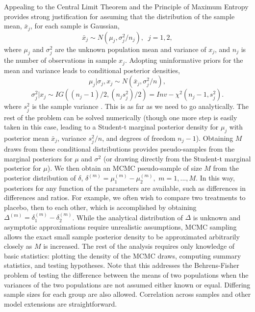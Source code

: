 \documentclass{juliacon}
\begin{document}
Appealing to the Central Limit Theorem and the Principle of Maximum Entropy provides strong justification for assuming that the distribution of the sample mean, $\bar{x}_j$, for each sample is Gaussian, 
\begin{equation}
\bar{x}_j \sim N(\mu_j,\sigma_j^2/n_j ), \; \;    j=1,2,
\label{eq:xbar}
\end{equation}
where $\mu_j$ and $\sigma_j^2$ are the unknown population mean and variance of $x_j$, and $n_j$ is the number of observations in sample $x_j$. Adopting uninformative priors for the mean and variance leads to conditional posterior densities,
\begin{equation}
\mu_j | \sigma_j,x_j \sim N(\bar{x}_j, \sigma_j^2 /n),
\label{eq:muj}
\end{equation}
\begin{equation}
\sigma_j^2|x_j \sim IG((n_j-1)/2,(n_js_j^2)/2) = Inv-\chi^2(n_j-1,s_j^2).
\label{eq:sigmaj}
\end{equation}
where $s_j^2$ is the sample variance \cite{Gelman2004}. This is as far as we need to go analytically.  The rest of the problem can be solved numerically (though one more step is easily taken in this case, leading to a Student-t marginal posterior density for $\mu_j$ with posterior mean $\bar{x}_j$, variance $s_j^2/n$, and degrees of freedom $n_j-1$).
\vskip 6pt
Obtaining $M$ draws from these conditional distributions provides pseudo-samples from the marginal posteriors for $\mu$ and $\sigma^2$ (or drawing directly from the Student-t marginal posterior for $\mu$).  We then obtain an MCMC pseudo-sample of size $M$ from the posterior distribution of $\delta$, $\delta^{(m)} = \mu_1^{(m)} - \mu_2^{(m)},$ $m = 1,...,M$.  In this way, posteriors for any function of the parameters are available, such as differences in differences and ratios. For example, we often wish to compare two treatments to placebo, then to each other, which is accomplished by obtaining $\Delta^{(m)} = \delta_1^{(m)} - \delta_2^{(m)}$. While the analytical distribution of $\Delta$ is unknown and asymptotic approximations require unrealistic assumptions,  MCMC sampling allows the exact small sample posterior density to be approximated arbitrarily closely as $M$ is increased. The rest of the analysis requires only knowledge of basic statistics: plotting the density of the MCMC draws, computing summary statistics, and testing hypotheses.   Note that this addresses the Behrens-Fisher problem of testing the difference between the means of two populations when the variances of the two populations are not assumed either known or equal\cite{Ramos2010}.  Differing sample sizes for each group are also allowed.  Correlation across samples and other model extensions are straightforward.
\end{document}

